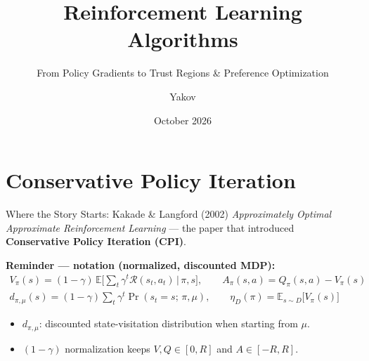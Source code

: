 \documentclass[aspectratio=169]{beamer}
\title{Reinforcement Learning Algorithms}
\subtitle{From Policy Gradients to Trust Regions \& Preference Optimization}
\author{Yakov}
\date{October 2026}
\newcommand{\E}{\mathbb{E}}
\begin{document}
\begin{frame}
  \titlepage
\end{frame}

\section{Conservative Policy Iteration}


\begin{frame}{Where the Story Starts: Kakade \& Langford (2002)}
  \textit{Approximately Optimal Approximate Reinforcement Learning} --- the paper that introduced \textbf{Conservative Policy Iteration (CPI)}.

  \vspace{6pt}
  \begin{slatebox}
    \small\textbf{Reminder --- notation (normalized, discounted MDP):}
    \begin{gather*}
      V_\pi(s) = (1-\gamma)\,\E\Big[\textstyle\sum_{t} \gamma^t \mathcal{R}(s_t,a_t) \,\Big|\, \pi, s\Big], \qquad
      A_\pi(s,a) = Q_\pi(s,a) - V_\pi(s) \\
      d_{\pi,\mu}(s) = (1-\gamma)\textstyle\sum_{t} \gamma^t \Pr(s_t = s;\, \pi, \mu), \qquad
      \eta_D(\pi) = \E_{s\sim D}\big[V_\pi(s)\big]
    \end{gather*}
  \end{slatebox}
  \begin{itemize}
    \item $d_{\pi,\mu}$: discounted state-visitation distribution when starting from $\mu$.
    \item $(1-\gamma)$ normalization keeps $V, Q \in [0,R]$ and $A \in [-R,R]$.
  \end{itemize}
\end{frame}
\end{document}
